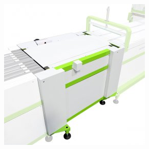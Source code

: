 \begin{frame}
\begin{figure}[ht]
\begin{center}
\includegraphics[scale=0.2]{"./image/ROQ/maquinas/ROQ-LABEL1-275x275.jpg"}
\end{center}
\end{figure}
\end{frame}
